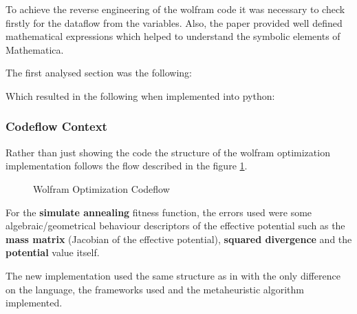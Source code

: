 To achieve the reverse engineering of the wolfram code it was 
necessary to check firstly for the dataflow from the variables.
Also, the paper \cite{Damian_2022} provided well defined
mathematical expressions which helped to understand the
symbolic elements of Mathematica.

The first analysed section was the following:



Which resulted in the following when implemented into python:



\subsubsection{Codeflow Context}

Rather than just showing the code the structure of the wolfram
optimization implementation follows the flow described in the
figure \ref{fig:flowchart_optimization_wolfram}.

\begin{figure}[h]
   
   \caption{Wolfram Optimization Codeflow}
   \label{fig:flowchart_optimization_wolfram}
\end{figure}

For the \textbf{simulate annealing} fitness function, the errors  used
were some algebraic/geometrical behaviour descriptors of the
effective potential such as the \textbf{mass matrix} (Jacobian of the 
effective potential), \textbf{squared divergence} and the \textbf{potential}
value itself.

The new implementation used the same structure as in \cite{Damian_2022}
with the only difference on the language, the frameworks used
and the metaheuristic algorithm implemented.
